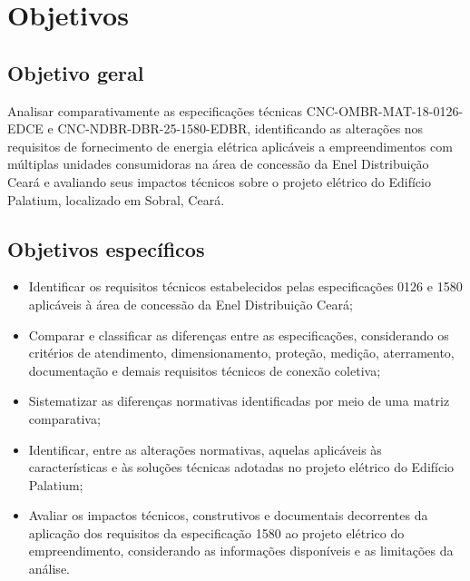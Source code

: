 \chapter{Objetivos}
\label{cap:objetivos}

\section{Objetivo geral}

Analisar comparativamente as especificações técnicas CNC-OMBR-MAT-18-0126-EDCE e CNC-NDBR-DBR-25-1580-EDBR, identificando as alterações nos requisitos de fornecimento de energia elétrica aplicáveis a empreendimentos com múltiplas unidades consumidoras na área de concessão da Enel Distribuição Ceará e avaliando seus impactos técnicos sobre o projeto elétrico do Edifício Palatium, localizado em Sobral, Ceará.

\section{Objetivos específicos}

\begin{itemize}
  \item Identificar os requisitos técnicos estabelecidos pelas especificações 0126 e 1580 aplicáveis à área de concessão da Enel Distribuição Ceará;
  \item Comparar e classificar as diferenças entre as especificações, considerando os critérios de atendimento, dimensionamento, proteção, medição, aterramento, documentação e demais requisitos técnicos de conexão coletiva;
  \item Sistematizar as diferenças normativas identificadas por meio de uma matriz comparativa;
  \item Identificar, entre as alterações normativas, aquelas aplicáveis às características e às soluções técnicas adotadas no projeto elétrico do Edifício Palatium;
  \item Avaliar os impactos técnicos, construtivos e documentais decorrentes da aplicação dos requisitos da especificação 1580 ao projeto elétrico do empreendimento, considerando as informações disponíveis e as limitações da análise.
\end{itemize}
